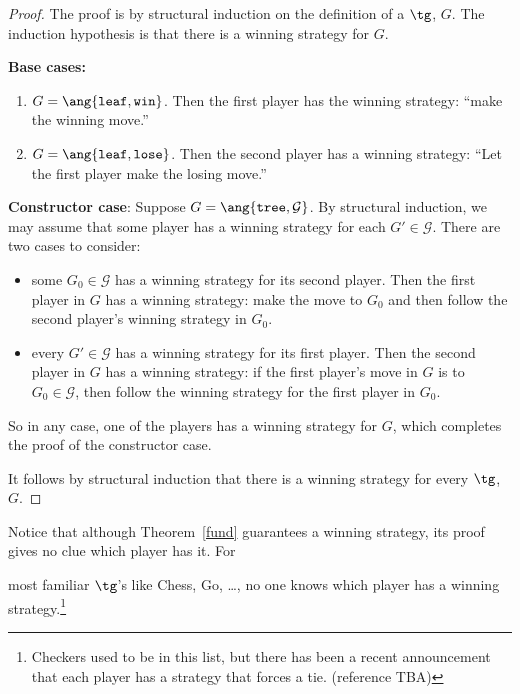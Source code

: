 \begin{definition}
\begin{proof}
The proof is by structural induction on the definition of a $\tg$, $G$.
The induction hypothesis is that there is a winning strategy for $G$.

\textbf{Base cases:}
\begin{enumerate}

\item $G=\ang{\texttt{leaf}, \texttt{win}}$.  Then the first player has the
 winning strategy: ``make the winning move.''

\item $G=\ang{\texttt{leaf}, \texttt{lose}}$.  Then the second player has a
 winning strategy: ``Let the first player make the losing move.''
\end{enumerate}

\textbf{Constructor case}: Suppose $G = \ang{\texttt{tree},\mathcal{G}}$.
By structural induction, we may assume that some player has a winning
strategy for each $G' \in \mathcal{G}$.  There are two cases to consider:
\begin{itemize}
\item some $G_0 \in \mathcal{G}$ has a winning strategy for its second
  player.  Then the first player in $G$ has a winning strategy: make the
  move to $G_0$ and then follow the second player's winning strategy in
  $G_0$.

\item every $G' \in \mathcal{G}$ has a winning strategy for its first
  player.  Then the second player in $G$ has a winning strategy: if the
  first player's move in $G$ is to $G_0 \in \mathcal{G}$, then follow the
  winning strategy for the first player in $G_0$.
\end{itemize}
So in any case, one of the players has a winning strategy for $G$, which
completes the proof of the constructor case.

It follows by structural induction that there is a winning strategy for
every $\tg$, $G$.
\end{proof}

Notice that although Theorem~\ref{fund} guarantees a winning strategy, its
proof gives no clue which player has it.  For

most familiar $\tg$'s like Chess, Go, \dots, no one knows
which player has a winning strategy.\footnote{Checkers used to be in this
  list, but there has been a recent announcement that each player has a
  strategy that forces a tie. (reference TBA)}


\end{definition}
